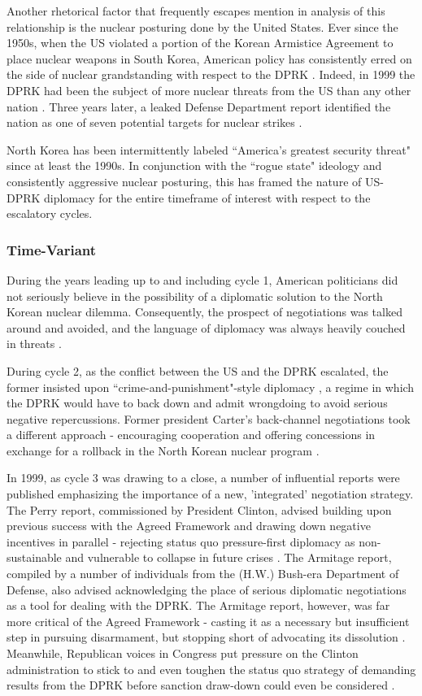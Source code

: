 \documentclass{article}
\begin{document}
Another rhetorical factor that frequently escapes mention in analysis of this relationship is the nuclear posturing done by the United States. Ever since the 1950s, when the US violated a portion of the Korean Armistice Agreement to place nuclear weapons in South Korea, American policy has consistently erred on the side of nuclear grandstanding with respect to the DPRK \cite{cumings}. Indeed, in 1999 the DPRK had been the subject of more nuclear threats from the US than any other nation \cite{sigal}. Three years later, a leaked Defense Department report identified the nation as one of seven potential targets for nuclear strikes \cite{harnisch}.

North Korea has been intermittently labeled ``America's greatest security threat"\cite{cumings} since at least the 1990s. In conjunction with the ``rogue state" ideology and consistently aggressive nuclear posturing, this has framed the nature of US-DPRK diplomacy for the entire timeframe of interest with respect to the escalatory cycles.

\subsubsection{Time-Variant}

During the years leading up to and including cycle 1, American politicians did not seriously believe in the possibility of a diplomatic solution to the North Korean nuclear dilemma. Consequently, the prospect of negotiations was talked around and avoided, and the language of diplomacy was always heavily couched in threats \cite{sigal}.

During cycle 2, as the conflict between the US and the DPRK escalated, the former insisted upon ``crime-and-punishment"-style diplomacy \cite{bleiker}, a regime in which the DPRK would have to back down and admit wrongdoing to avoid serious negative repercussions. Former president Carter's back-channel negotiations took a different approach - encouraging cooperation and offering concessions in exchange for a rollback in the North Korean nuclear program \cite{sigal}.

In 1999, as cycle 3 was drawing to a close, a number of influential reports were published emphasizing the importance of a new, 'integrated' negotiation strategy. The Perry report, commissioned by President Clinton, advised building upon previous success with the Agreed Framework and drawing down negative incentives in parallel - rejecting status quo pressure-first diplomacy as non-sustainable and vulnerable to collapse in future crises \cite{perry}. The Armitage report, compiled by a number of individuals from the (H.W.) Bush-era Department of Defense, also advised acknowledging the place of serious diplomatic negotiations as a tool for dealing with the DPRK. The Armitage report, however, was far more critical of the Agreed Framework - casting it as a necessary but insufficient step in pursuing disarmament, but stopping short of advocating its dissolution \cite{armitage}. Meanwhile, Republican voices in Congress put pressure on the Clinton administration to stick to and even toughen the status quo strategy of demanding results from the DPRK before sanction draw-down could even be considered \cite{harnisch}. 
\end{document}
